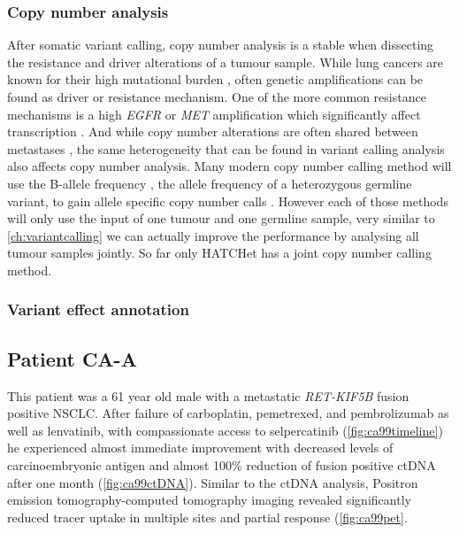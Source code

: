 \subsubsection{Copy number analysis}
\label{cascade-sec:cnv}
After somatic variant calling, copy number analysis is a stable when dissecting the resistance and driver alterations of a tumour sample. While lung cancers are known for their high mutational burden \cite{Alexandrov2020}, often genetic amplifications can be found as driver or resistance mechanism. One of the more common resistance mechanisms is a high \textit{EGFR} or \textit{MET} amplification which significantly affect transcription \cite{Bjaanaes2021}. And while copy number alterations are often shared between metastases \cite{Ni2013}, the same heterogeneity that can be found in variant calling analysis also affects copy number analysis. Many modern copy number calling method will use the B-allele frequency , the allele frequency of a heterozygous germline variant, to gain allele specific copy number calls \cite{Favero2015,Talevich2016,Cameron2019a}. However each of those methods will only use the input of one tumour and one germline sample, very similar to \autoref{ch:variantcalling} we can actually improve the performance by analysing all tumour samples jointly. So far only HATCHet \cite{Zaccaria2020} has a joint copy number calling method.


\subsubsection{Variant effect annotation}
\label{cascade-sec:vep}

\subsection{Patient CA-A}
\label{cascade-sec:CA99}

This patient was a 61 year old male  with a metastatic \textit{RET-KIF5B} fusion positive NSCLC. After failure of carboplatin, pemetrexed, and pembrolizumab as well as lenvatinib, with compassionate access to selpercatinib (\autoref{fig:ca99timeline}) he experienced almost immediate improvement with decreased levels of carcinoembryonic antigen and almost 100\% reduction of fusion positive ctDNA after one month (\autoref{fig:ca99ctDNA}). Similar to the ctDNA analysis, Positron emission tomography-computed tomography imaging revealed significantly reduced tracer uptake in multiple sites and partial response (\autoref{fig:ca99pet}.

